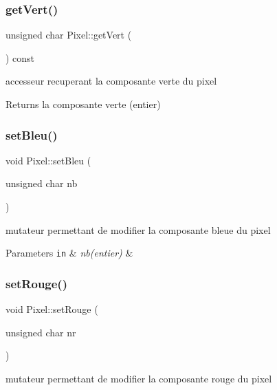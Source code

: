 \subsubsection{\texorpdfstring{get\+Vert()}{getVert()}}
{\footnotesize\ttfamily unsigned char Pixel\+::get\+Vert (\begin{DoxyParamCaption}{ }\end{DoxyParamCaption}) const}



accesseur recuperant la composante verte du pixel 

\begin{DoxyReturn}{Returns}
la composante verte (entier) 
\end{DoxyReturn}
\mbox{\label{classPixel_a706ee4cd16d1098fab21c727c90cb00b}} 
\subsubsection{\texorpdfstring{set\+Bleu()}{setBleu()}}
{\footnotesize\ttfamily void Pixel\+::set\+Bleu (\begin{DoxyParamCaption}\item[{unsigned char}]{nb }\end{DoxyParamCaption})}



mutateur permettant de modifier la composante bleue du pixel 


\begin{DoxyParams}[1]{Parameters}
\mbox{\tt in}  & {\em nb(entier)} & \\
\hline
\end{DoxyParams}
\mbox{\label{classPixel_a46ffac40207a65c1481afcb2b156e433}} 
\subsubsection{\texorpdfstring{set\+Rouge()}{setRouge()}}
{\footnotesize\ttfamily void Pixel\+::set\+Rouge (\begin{DoxyParamCaption}\item[{unsigned char}]{nr }\end{DoxyParamCaption})}



mutateur permettant de modifier la composante rouge du pixel 


